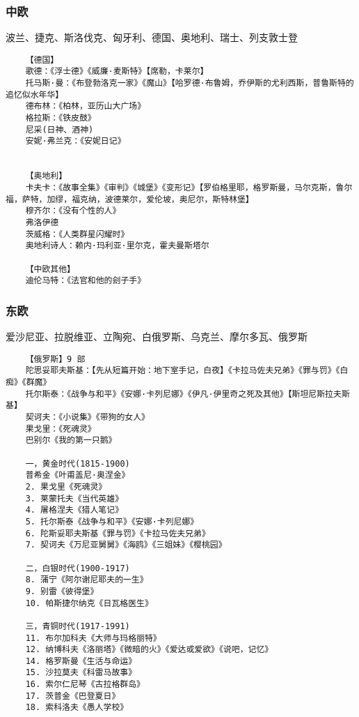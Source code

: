 \documentclass[UTF8]{../RepresentationUniverse}
\begin{document}
\subsubsection{中欧}
波兰、捷克、斯洛伐克、匈牙利、德国、奥地利、瑞士、列支敦士登
\begin{lstlisting}
    【德国】
    歌德：《浮士德》《威廉·麦斯特》【席勒，卡莱尔】
    托马斯·曼：《布登勃洛克一家》《魔山》【哈罗德·布鲁姆，乔伊斯的尤利西斯，普鲁斯特的追忆似水年华】
    德布林：《柏林，亚历山大广场》
    格拉斯：《铁皮鼓》
    尼采(日神、酒神) 
    安妮·弗兰克：《安妮日记》


    【奥地利】
    卡夫卡：《故事全集》《审判》《城堡》《变形记》【罗伯格里耶，格罗斯曼，马尔克斯，鲁尔福，萨特，加缪，福克纳，波德莱尔，爱伦坡，奥尼尔，斯特林堡】
    穆齐尔：《没有个性的人》
    弗洛伊德
    茨威格：《人类群星闪耀时》
    奥地利诗人：赖内·玛利亚·里尔克，霍夫曼斯塔尔

    【中欧其他】
    迪伦马特：《法官和他的刽子手》
\end{lstlisting}



\subsubsection{东欧}
爱沙尼亚、拉脱维亚、立陶宛、白俄罗斯、乌克兰、摩尔多瓦、俄罗斯
\begin{lstlisting}
    【俄罗斯】9 部 
    陀思妥耶夫斯基：【先从短篇开始：地下室手记，白夜】《卡拉马佐夫兄弟》《罪与罚》《白痴》《群魔》
    托尔斯泰：《战争与和平》《安娜·卡列尼娜》《伊凡·伊里奇之死及其他》【斯坦尼斯拉夫斯基】
    契诃夫：《小说集》《带狗的女人》
    果戈里：《死魂灵》
    巴别尔《我的第一只鹅》

    一，黄金时代(1815-1900) 
    普希金《叶甫盖尼·奥涅金》
    2. 果戈里《死魂灵》
    3. 莱蒙托夫《当代英雄》
    4. 屠格涅夫《猎人笔记》
    5. 托尔斯泰《战争与和平》《安娜·卡列尼娜》
    6. 陀斯妥耶夫斯基《罪与罚》《卡拉马佐夫兄弟》
    7. 契诃夫《万尼亚舅舅》《海鸥》《三姐妹》《樱桃园》
    
    二，白银时代(1900-1917) 
    8. 蒲宁《阿尔谢尼耶夫的一生》
    9. 别雷《彼得堡》
    10. 帕斯捷尔纳克《日瓦格医生》
    
    三，青铜时代(1917-1991) 
    11. 布尔加科夫《大师与玛格丽特》
    12. 纳博科夫《洛丽塔》《微暗的火》《爱达或爱欲》《说吧，记忆》
    14. 格罗斯曼《生活与命运》
    15. 沙拉莫夫《科雷马故事》
    16. 索尔仁尼琴《古拉格群岛》
    17. 茨普金《巴登夏日》
    18. 索科洛夫《愚人学校》




\end{lstlisting}
\end{document}
